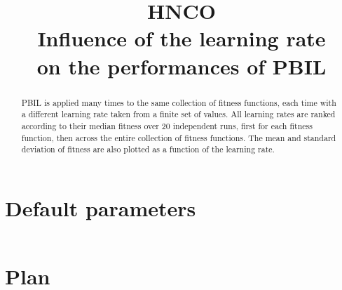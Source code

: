 \documentclass[a4paper]{article}
\begin{document}

\title{HNCO\\
  Influence of the learning rate\\
  on the performances of PBIL}
\maketitle

\begin{abstract}
  PBIL is applied many times to the same collection of fitness
  functions, each time with a different learning rate taken from a
  finite set of values. All learning rates are ranked according to
  their median fitness over 20 independent runs, first for each
  fitness function, then across the entire collection of fitness
  functions. The mean and standard deviation of fitness are also
  plotted as a function of the learning rate.
\end{abstract}

\tableofcontents

\newpage

\section{Default parameters}

\inputminted[breaklines=true]{text}{../log.default}

\section{Plan}

\inputminted[breaklines=true]{json}{../plan-compact.json}


\end{document}
